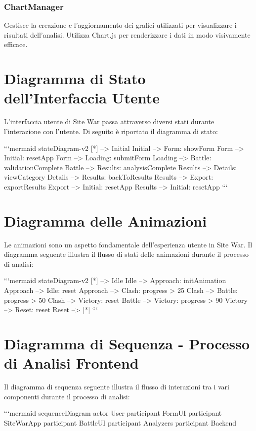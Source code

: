 \subsubsection{ChartManager}
Gestisce la creazione e l'aggiornamento dei grafici utilizzati per visualizzare i risultati dell'analisi. Utilizza Chart.js per renderizzare i dati in modo visivamente efficace.

\section{Diagramma di Stato dell'Interfaccia Utente}
L'interfaccia utente di Site War passa attraverso diversi stati durante l'interazione con l'utente. Di seguito è riportato il diagramma di stato:

```mermaid
stateDiagram-v2
    [*] --> Initial
    Initial --> Form: showForm
    Form --> Initial: resetApp
    Form --> Loading: submitForm
    Loading --> Battle: validationComplete
    Battle --> Results: analysisComplete
    Results --> Details: viewCategory
    Details --> Results: backToResults
    Results --> Export: exportResults
    Export --> Initial: resetApp
    Results --> Initial: resetApp
```

\section{Diagramma delle Animazioni}
Le animazioni sono un aspetto fondamentale dell'esperienza utente in Site War. Il diagramma seguente illustra il flusso di stati delle animazioni durante il processo di analisi:

```mermaid
stateDiagram-v2
    [*] --> Idle
    Idle --> Approach: initAnimation
    Approach --> Idle: reset
    Approach --> Clash: progress > 25%
    Clash --> Battle: progress > 50%
    Clash --> Victory: reset
    Battle --> Victory: progress > 90%
    Victory --> Reset: reset
    Reset --> [*]
```

\section{Diagramma di Sequenza - Processo di Analisi Frontend}
Il diagramma di sequenza seguente illustra il flusso di interazioni tra i vari componenti durante il processo di analisi:

```mermaid
sequenceDiagram
    actor User
    participant FormUI
    participant SiteWarApp
    participant BattleUI
    participant Analyzers
    participant Backend
    
